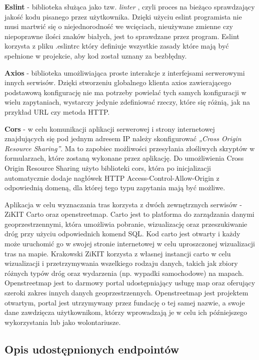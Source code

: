 \textbf{Eslint} - biblioteka służąca jako tzw. \textit{linter} , czyli proces na bieżąco sprawdzający jakość kodu pisanego przez użytkownika. Dzięki użyciu eslint programista nie musi martwić się o niejednorodność we wcięciach, nieużywane zmienne czy niepoprawne ilości znaków białych, jest to sprawdzane przez program. Eslint korzysta z pliku .eslintrc który definiuje wszystkie zasady które mają być spełnione w projekcie, aby kod został uznany za bezbłędny.\newline

\textbf{Axios} - biblioteka umożliwiająca proste interakcje z interfejsami serwerowymi innych serwisów. Dzięki stworzeniu globalnego klienta axios zawierającego podstawową konfigurację nie ma potrzeby powielać tych samych konfiguracji w wielu zapytaniach, wystarczy jedynie zdefiniować rzeczy, które się różnią, jak na przykład URL czy metoda HTTP.\newline

\textbf{Cors} - w celu komunikacji aplikacji serwerowej i strony internetowej znajdujących się pod jednym adresem IP należy skonfigurować \textit{„Cross Origin Resource Sharing”}. Ma to zapobiec możliwości przesyłania złośliwych skryptów w formularzach, które zostaną wykonane przez aplikację. Do umożliwienia Cross Origin Resource Sharing użyto biblioteki cors, która po inicjalizacji automatycznie dodaje nagłówek HTTP Access-Control-Allow-Origin z odpowiednią domeną, dla której tego typu zapytania mają być możliwe.\newline

Aplikacja w celu wyznaczania tras korzysta z dwóch zewnętrznych serwisów - ZiKIT Carto oraz openstreetmap. Carto jest to platforma do zarządzania danymi geoprzestrzennymi, która umożliwia pobranie, wizualizację oraz przeszukiwanie dróg przy użyciu odpowiednich komend SQL. Kod carto jest otwarty i każdy może uruchomić go w swojej stronie internetowej w celu uproszczonej wizualizacji tras na mapie. Krakowski ZiKIT korzysta z własnej instancji carto w celu wizualizacji i przetrzymywania wszelkiego rodzaju danych, takich jak zbiory różnych typów dróg oraz wydarzenia (np. wypadki samochodowe) na mapach. Openstreetmap jest to darmowy portal udostępniający usługę map oraz oferujący szeroki zakres innych danych geoprzestrzennych. Openstreetmap jest projektem otwartym, portal jest utrzymywany przez fundację o tej samej nazwie, a swoje dane zawdzięcza użytkownikom, którzy wprowadzają je w celu ich późniejszego wykorzystania lub jako wolontariusze.

\subsection{Opis udostępnionych endpointów}

